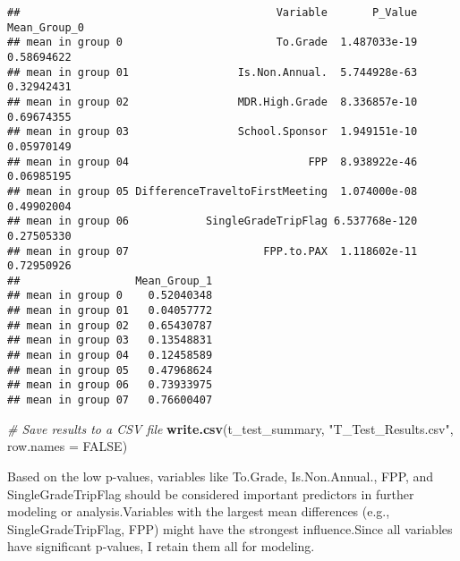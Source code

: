 \documentclass[
]{article}
\newenvironment{Shaded}{\begin{snugshade}}{\end{snugshade}}
\newcommand{\AttributeTok}[1]{\textcolor[rgb]{0.13,0.29,0.53}{#1}}
\newcommand{\CommentTok}[1]{\textcolor[rgb]{0.56,0.35,0.01}{\textit{#1}}}
\newcommand{\ConstantTok}[1]{\textcolor[rgb]{0.56,0.35,0.01}{#1}}
\newcommand{\FunctionTok}[1]{\textcolor[rgb]{0.13,0.29,0.53}{\textbf{#1}}}
\newcommand{\NormalTok}[1]{#1}
\newcommand{\StringTok}[1]{\textcolor[rgb]{0.31,0.60,0.02}{#1}}
\begin{document}
\begin{verbatim}
##                                        Variable       P_Value Mean_Group_0
## mean in group 0                        To.Grade  1.487033e-19   0.58694622
## mean in group 01                 Is.Non.Annual.  5.744928e-63   0.32942431
## mean in group 02                 MDR.High.Grade  8.336857e-10   0.69674355
## mean in group 03                 School.Sponsor  1.949151e-10   0.05970149
## mean in group 04                            FPP  8.938922e-46   0.06985195
## mean in group 05 DifferenceTraveltoFirstMeeting  1.074000e-08   0.49902004
## mean in group 06            SingleGradeTripFlag 6.537768e-120   0.27505330
## mean in group 07                     FPP.to.PAX  1.118602e-11   0.72950926
##                  Mean_Group_1
## mean in group 0    0.52040348
## mean in group 01   0.04057772
## mean in group 02   0.65430787
## mean in group 03   0.13548831
## mean in group 04   0.12458589
## mean in group 05   0.47968624
## mean in group 06   0.73933975
## mean in group 07   0.76600407
\end{verbatim}

\begin{Shaded}
\begin{Highlighting}[]
\CommentTok{\# Save results to a CSV file}
\FunctionTok{write.csv}\NormalTok{(t\_test\_summary, }\StringTok{"T\_Test\_Results.csv"}\NormalTok{, }\AttributeTok{row.names =} \ConstantTok{FALSE}\NormalTok{)}
\end{Highlighting}
\end{Shaded}

Based on the low p-values, variables like To.Grade, Is.Non.Annual., FPP,
and SingleGradeTripFlag should be considered important predictors in
further modeling or analysis.Variables with the largest mean differences
(e.g., SingleGradeTripFlag, FPP) might have the strongest
influence.Since all variables have significant p-values, I retain them
all for modeling.
\end{document}
